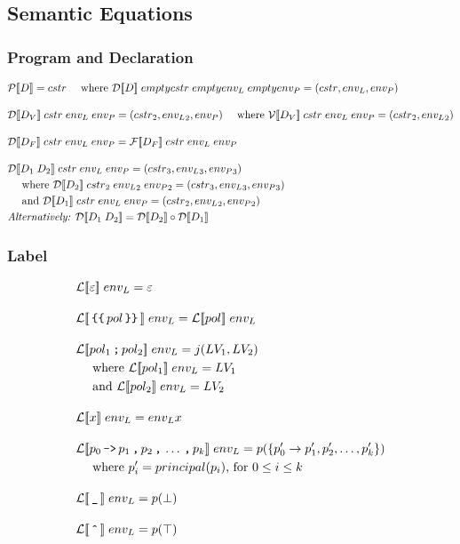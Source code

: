 \subsection{Semantic Equations}

\subsubsection{Program and Declaration}
\begin{align*}
& \iP\dblSq{D} = \icstr \dsWhere{\iD\dblSq{D} \; empty\icstr \; empty\ienvL \; empty\ienvP = (\icstr, \ienvL, \ienvP)} \rspace
& \iD\dblSq{D_V} \; \icstr \; \ienvL \; \ienvP = (\icstr_2, \ienvL_2, \ienvP) \dsWhere{\iV\dblSq{D_V} \; \icstr \; \ienvL \; \ienvP = (\icstr_2, \ienvL_2)} \rspace
& \iD\dblSq{D_F} \; \icstr \; \ienvL \; \ienvP = \iF\dblSq{D_F} \; \icstr \; \ienvL \; \ienvP \rspace
& \iD\dblSq{D_1 \; D_2} \; \icstr \; \ienvL \; \ienvP = (\icstr_3, \ienvL_3, \ienvP_3) \\
& \quad \text{ where } \iD\dblSq{D_2} \; \icstr_2 \; \ienvL_2 \; \ienvP_2  = (\icstr_3, \ienvL_3, \ienvP_3) \\
& \quad \text{ and } \iD\dblSq{D_1} \; \icstr \; \ienvL \; \ienvP = (\icstr_2, \ienvL_2, \ienvP_2) \\
& \textit{Alternatively: } \iD\dblSq{D_1 \; D_2} = \iD\dblSq{D_2} \circ \iD\dblSq{D_1}
\end{align*}

\subsubsection{Label}
\begin{align*}
& \iL\dblSq{\varepsilon} \; \ienvL = \varepsilon \rspace
%
& \iL\dblSq{\tk{\{\{} pol \tk{\}\}}} \; \ienvL = \iL\dblSq{pol} \; \ienvL \rspace
%
& \iL\dblSq{pol_1 \tk ; pol_2} \; \ienvL = j(\iLV_1, \iLV_2) \\
& \dsWhere{\iL\dblSq{pol_1} \; \ienvL = \iLV_1} \\
& \dsAnd{\iL\dblSq{pol_2} \; \ienvL = \iLV_2} \rspace
%
& \iL\dblSq{x} \; \ienvL = \ienvL x \rspace
%
& \iL\dblSq{p_0 \tk{->} p_1 \tk , p_2 \tk, \dots \tk , p_k} \; \ienvL = p(\{p_0' \rightarrow p_1', p_2', \dots, p_k'\}) \\
& \dsWhere{p_i' = principal(p_i) \text{, for } 0 \leq i \leq k} \rspace
%
& \iL\dblSq{\tk \_} \; \ienvL = p(\bot) \rspace
& \iL\dblSq{\tk{\^{}}} \; \ienvL = p(\top)
\end{align*}

